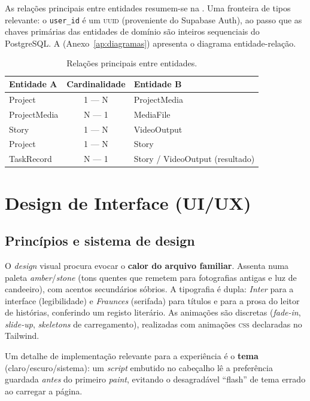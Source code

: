 As relações principais entre entidades resumem-se na .
Uma fronteira de tipos relevante: o \texttt{user\_id} é um \textsc{uuid}
(proveniente do Supabase Auth), ao passo que as chaves primárias das
entidades de domínio são inteiros sequenciais do PostgreSQL. A
 (Anexo~\ref{ap:diagramas}) apresenta o diagrama
entidade-relação.

\begin{table}[H]
\centering
\caption{Relações principais entre entidades.}
\label{tab:relacoes}
\small
\begin{tabular}{@{}lcl@{}}
\toprule
\textbf{Entidade A} & \textbf{Cardinalidade} & \textbf{Entidade B} \\
\midrule
Project      & 1 --- N & ProjectMedia \\
ProjectMedia & N --- 1 & MediaFile \\
Story        & 1 --- N & VideoOutput \\
Project      & 1 --- N & Story \\
TaskRecord   & N --- 1 & Story / VideoOutput (resultado) \\
\bottomrule
\end{tabular}
\end{table}


\section{Design de Interface (UI/UX)}
\label{sec:uiux}

\subsection{Princípios e sistema de design}

O \emph{design} visual procura evocar o \textbf{calor do arquivo
familiar}. Assenta numa paleta \emph{amber}/\emph{stone} (tons quentes
que remetem para fotografias antigas e luz de candeeiro), com acentos
secundários sóbrios. A tipografia é dupla: \emph{Inter} para a interface
(legibilidade) e \emph{Fraunces} (serifada) para títulos e para a prosa
do leitor de histórias, conferindo um registo literário. As animações são
discretas (\emph{fade-in}, \emph{slide-up}, \emph{skeletons} de
carregamento), realizadas com animações \textsc{css} declaradas no Tailwind.

Um detalhe de implementação relevante para a experiência é o
\textbf{tema} (claro/escuro/sistema): um \emph{script} embutido no
cabeçalho lê a preferência guardada \emph{antes} do primeiro
\emph{paint}, evitando o desagradável ``flash'' de tema errado ao
carregar a página.

